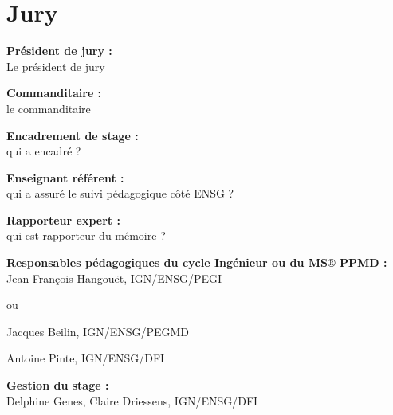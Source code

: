 \thispagestyle{plain}
\section*{Jury}
\vspace{0.5cm}

\textbf{Président de jury :} \\

Le président de jury

\vspace{0.5cm}

\textbf{Commanditaire :} \\

le commanditaire

\vspace{0.5cm}

\textbf{Encadrement de stage :} \\ 


qui a encadré ?

\vspace{0.5cm}

\textbf{Enseignant référent :} \\ 

qui a assuré le suivi pédagogique côté ENSG ?

\vspace{0.5cm}

\textbf{Rapporteur expert :} \\ 

qui est rapporteur du mémoire ?

\vspace{0.5cm}

\textbf{Responsable{\color{magenta}s} pédagogique{\color{magenta}s} du {\color{red} cycle Ingénieur} ou du {\color{magenta}MS$\circledR$ PPMD} :} \\



{\color{red}Jean-François Hangouët, IGN/ENSG/PEGI}

ou 

{\color{magenta}
Jacques Beilin, IGN/ENSG/PEGMD

Antoine Pinte, IGN/ENSG/DFI
}

\vspace{0.5cm}

\textbf{Gestion du stage :} \\ 

Delphine Genes, Claire Driessens, IGN/ENSG/DFI

\vspace{0.5cm}


